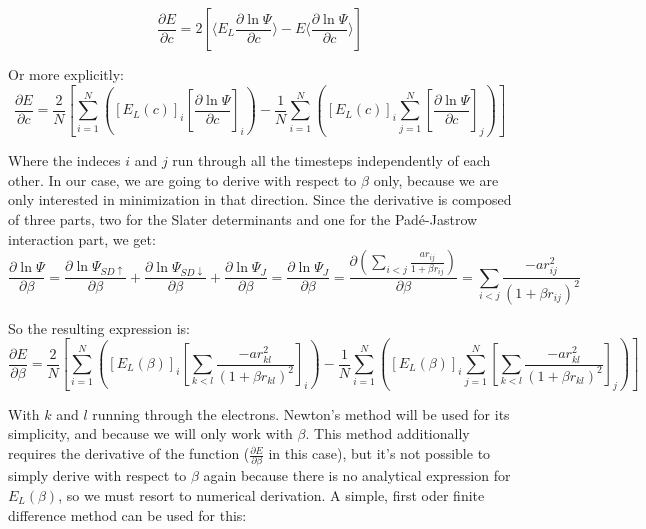		\begin{equation}\frac{\partial E}{\partial c}=2\left[\langle E_L\frac{\partial\ln{\Psi}}{\partial c}\rangle-E\langle\frac{\partial\ln{\Psi}}{\partial c}\rangle\right]\end{equation}

		Or more explicitly:\\

		\begin{equation}\frac{\partial E}{\partial c}=\frac{2}{N}\left[\sum_{i=1}^N\left(\left[E_L\left(c\right)\right]_i\left[\frac{\partial\ln{\Psi}}{\partial c}\right]_i\right)-\frac{1}{N}\sum_{i=1}^N\left(\left[E_L\left(c\right)\right]_i\sum_{j=1}^N\left[\frac{\partial\ln{\Psi}}{\partial c}\right]_j\right)\right]\end{equation}

		Where the indeces $i$ and $j$ run through all the timesteps independently of each other. In our case, we are going to derive with respect to $\beta$ only, because we are only interested in minimization in that direction. Since the derivative is composed of three parts, two for the Slater determinants and one for the Padé-Jastrow interaction part, we get:\\

		\begin{equation}\frac{\partial\ln{\Psi}}{\partial\beta}=\frac{\partial\ln{\Psi_{SD\uparrow}}}{\partial\beta}+\frac{\partial\ln{\Psi_{SD\downarrow}}}{\partial\beta}+\frac{\partial\ln{\Psi_J}}{\partial\beta}=\frac{\partial\ln{\Psi_J}}{\partial\beta}=\frac{\partial\left(\sum_{i<j}\frac{ar_{ij}}{1+\beta r_{ij}}\right)}{\partial\beta}=\sum_{i<j}\frac{-ar_{ij}^2}{\left(1+\beta r_{ij}\right)^2}\end{equation}

		So the resulting expression is:\\

		\begin{equation}\frac{\partial E}{\partial\beta}=\frac{2}{N}\left[\sum_{i=1}^N\left(\left[E_L\left(\beta\right)\right]_i\left[\sum_{k<l}\frac{-ar_{kl}^2}{\left(1+\beta r_{kl}\right)^2}\right]_i\right)-\frac{1}{N}\sum_{i=1}^N\left(\left[E_L\left(\beta\right)\right]_i\sum_{j=1}^N\left[\sum_{k<l}\frac{-ar_{kl}^2}{\left(1+\beta r_{kl}\right)^2}\right]_j\right)\right]\end{equation}

		With $k$ and $l$ running through the electrons. Newton's method will be used for its simplicity, and because we will only work with $\beta$. This method additionally requires the derivative of the function ($\frac{\partial E}{\partial\beta}$ in this case), but it's not possible to simply derive with respect to $\beta$ again because there is no analytical expression for $E_L\left(\beta\right)$, so we must resort to numerical derivation. A simple, first oder finite difference method can be used for this:\\

